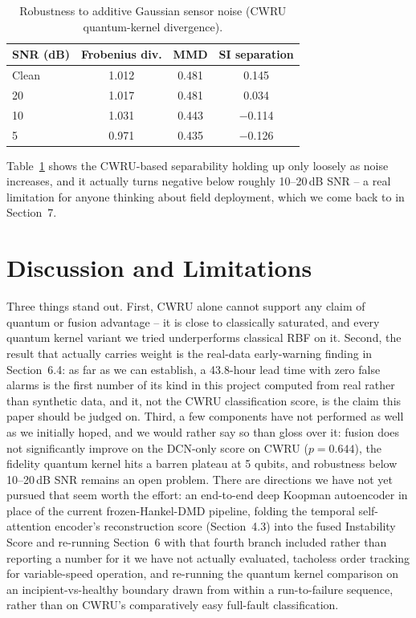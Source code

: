 \documentclass[3p,times,procedia]{elsarticle}
\begin{document}
\begin{table}[ht]
\caption{Robustness to additive Gaussian sensor noise (CWRU quantum-kernel divergence).}
\label{tab:noise}
\centering
\begin{tabular}{lccc}
\toprule
\textbf{SNR (dB)} & \textbf{Frobenius div.} & \textbf{MMD} & \textbf{SI separation} \\
\midrule
Clean & 1.012 & 0.481 & 0.145 \\
20 & 1.017 & 0.481 & 0.034 \\
10 & 1.031 & 0.443 & $-$0.114 \\
5 & 0.971 & 0.435 & $-$0.126 \\
\bottomrule
\end{tabular}
\end{table}

Table~\ref{tab:noise} shows the CWRU-based separability holding up only loosely as noise increases, and it actually turns negative below roughly 10--20\,dB SNR -- a real limitation for anyone thinking about field deployment, which we come back to in Section~7.

\section{Discussion and Limitations}

Three things stand out. First, CWRU alone cannot support any claim of quantum or fusion advantage -- it is close to classically saturated, and every quantum kernel variant we tried underperforms classical RBF on it. Second, the result that actually carries weight is the real-data early-warning finding in Section~6.4: as far as we can establish, a 43.8-hour lead time with zero false alarms is the first number of its kind in this project computed from real rather than synthetic data, and it, not the CWRU classification score, is the claim this paper should be judged on. Third, a few components have not performed as well as we initially hoped, and we would rather say so than gloss over it: fusion does not significantly improve on the DCN-only score on CWRU ($p = 0.644$), the fidelity quantum kernel hits a barren plateau at 5 qubits, and robustness below 10--20\,dB SNR remains an open problem. There are directions we have not yet pursued that seem worth the effort: an end-to-end deep Koopman autoencoder \cite{lusch2018,shi2024} in place of the current frozen-Hankel-DMD pipeline, folding the temporal self-attention encoder's reconstruction score (Section~4.3) into the fused Instability Score and re-running Section~6 with that fourth branch included rather than reporting a number for it we have not actually evaluated, tacholess order tracking for variable-speed operation, and re-running the quantum kernel comparison on an incipient-vs-healthy boundary drawn from within a run-to-failure sequence, rather than on CWRU's comparatively easy full-fault classification.
\end{document}
